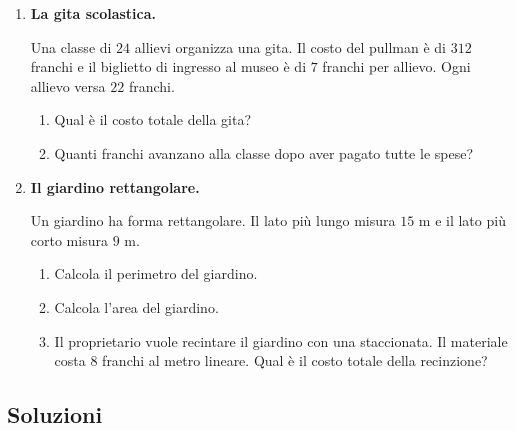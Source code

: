 \begin{enumerate}[label=\textbf{\arabic*.}, leftmargin=2em, itemsep=1.2ex,
            start=6]


      \item \textbf{La gita scolastica.}

            Una classe di $24$ allievi organizza una gita. Il costo del pullman
            è di $312$ franchi e il biglietto di ingresso al museo è di
            $7$ franchi per allievo. Ogni allievo versa $22$ franchi.

            \begin{enumerate}[label=\alph*), leftmargin=1.5em, itemsep=0.6ex]
                  \item Qual è il costo totale della gita?
                  \item Quanti franchi avanzano alla classe dopo aver pagato tutte
                        le spese?
            \end{enumerate}


      \item \textbf{Il giardino rettangolare.}

            Un giardino ha forma rettangolare. Il lato più lungo misura $15$ m
            e il lato più corto misura $9$ m.

            \begin{enumerate}[label=\alph*), leftmargin=1.5em, itemsep=0.6ex]
                  \item Calcola il perimetro del giardino.
                  \item Calcola l'area del giardino.
                  \item Il proprietario vuole recintare il giardino con una staccionata.
                        Il materiale costa $8$ franchi al metro lineare.
                        Qual è il costo totale della recinzione?
            \end{enumerate}

\end{enumerate}

\subsection*{Soluzioni}

